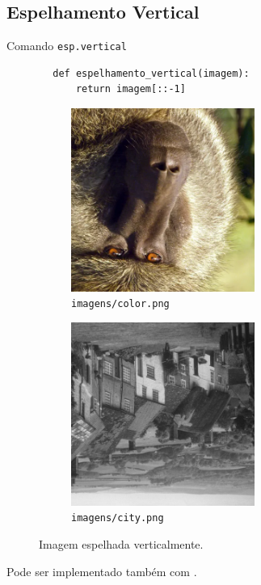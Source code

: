 \subsection{Espelhamento Vertical}

\begin{listing}[h]
    \caption{Comando \texttt{esp.vertical}}

    \begin{verbatim}
        def espelhamento_vertical(imagem):
            return imagem[::-1]
    \end{verbatim}
\end{listing}

\begin{figure}[h]
    \centering
    \begin{subfigure}{0.45\textwidth}
        \centering
        \includegraphics[width=6cm]{resultados/colorflip.png}
        \caption{\texttt{imagens/color.png}}
    \end{subfigure}%
    \begin{subfigure}{0.45\textwidth}
        \centering
        \includegraphics[width=6cm]{resultados/cityflip.png}
        \caption{\texttt{imagens/city.png}}
    \end{subfigure}

    \caption{Imagem espelhada verticalmente.}
\end{figure}

Pode ser implementado também com  \autocite{ref:flip}.
